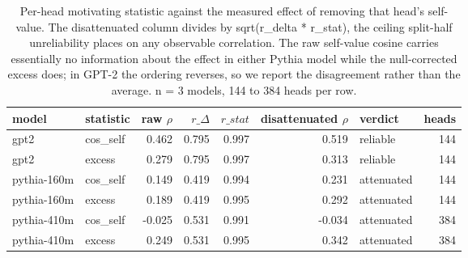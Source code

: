 \begin{table}[t]
  \centering
  \caption{Per-head motivating statistic against the measured effect of removing that head's self-value. The disattenuated column divides by sqrt(r\_delta * r\_stat), the ceiling split-half unreliability places on any observable correlation. The raw self-value cosine carries essentially no information about the effect in either Pythia model while the null-corrected excess does; in GPT-2 the ordering reverses, so we report the disagreement rather than the average. n = 3 models, 144 to 384 heads per row.}
  \label{tab:t5}
  \begin{tabular}{llrrrrlr}
    \toprule
    model & statistic & raw $\rho$ & $r\_\Delta$ & $r\_{stat}$ & disattenuated $\rho$ & verdict & heads \\
    \midrule
    gpt2 & cos\_self & 0.462 & 0.795 & 0.997 & 0.519 & reliable & 144 \\
    gpt2 & excess & 0.279 & 0.795 & 0.997 & 0.313 & reliable & 144 \\
    pythia-160m & cos\_self & 0.149 & 0.419 & 0.994 & 0.231 & attenuated & 144 \\
    pythia-160m & excess & 0.189 & 0.419 & 0.995 & 0.292 & attenuated & 144 \\
    pythia-410m & cos\_self & -0.025 & 0.531 & 0.991 & -0.034 & attenuated & 384 \\
    pythia-410m & excess & 0.249 & 0.531 & 0.995 & 0.342 & attenuated & 384 \\
    \bottomrule
  \end{tabular}
\end{table}
